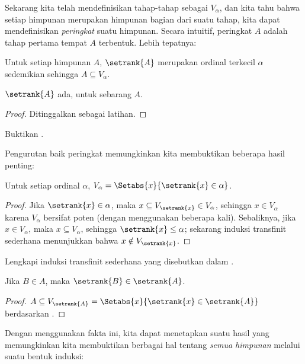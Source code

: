 \documentclass[../../../include/open-logic-section]{subfiles}
\begin{document}

Sekarang kita telah mendefinisikan tahap-tahap sebagai $V_\alpha$, dan kita
tahu bahwa setiap himpunan merupakan himpunan bagian dari suatu tahap, kita
dapat mendefinisikan \emph{peringkat} suatu himpunan. Secara intuitif,
peringkat $A$ adalah tahap pertama tempat $A$ terbentuk. Lebih tepatnya:

\begin{defn}
Untuk setiap himpunan $A$, $\setrank{A}$ merupakan ordinal terkecil $\alpha$
sedemikian sehingga $A \subseteq V_\alpha$.
\end{defn}
\begin{prop}
	$\setrank{A}$ ada, untuk sebarang $A$.
\end{prop}
\begin{proof}
	Ditinggalkan sebagai latihan.
\end{proof}
\begin{prob}
	Buktikan .
\end{prob}
\noindent
Pengurutan baik peringkat memungkinkan kita membuktikan beberapa hasil
penting:
\begin{prop}
Untuk setiap ordinal $\alpha$,
$V_\alpha = \Setabs{x}{\setrank{x} \in \alpha}$.
\end{prop}

\begin{proof}
Jika $\setrank{x} \in \alpha$, maka
$x \subseteq V_{\setrank{x}} \in V_\alpha$, sehingga $x \in V_\alpha$
karena $V_\alpha$ bersifat poten (dengan menggunakan
 beberapa kali). Sebaliknya, jika
$x \in V_\alpha$, maka $x \subseteq V_\alpha$, sehingga
$\setrank{x} \leq \alpha$; sekarang induksi transfinit sederhana menunjukkan
bahwa $x \notin V_{\setrank{x}}$.
\end{proof}
\begin{prob}
	Lengkapi induksi transfinit sederhana yang disebutkan dalam
	.
\end{prob}

\begin{prop}
Jika $B \in A$, maka $\setrank{B} \in \setrank{A}$.
\end{prop}

\begin{proof}
$A \subseteq V_{\setrank{A}} = \Setabs{x}{\setrank{x} \in
\setrank{A}}$ berdasarkan .
\end{proof}
\noindent
Dengan menggunakan fakta ini, kita dapat menetapkan suatu hasil yang
memungkinkan kita membuktikan berbagai hal tentang \emph{semua himpunan}
melalui suatu bentuk induksi:
\end{document}
